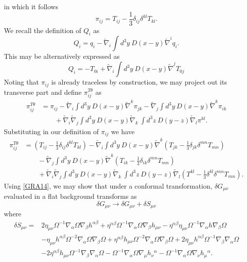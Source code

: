 \documentclass[10pt,letterpaper]{article}
\numberwithin{equation}{subsection}
\begin{document}
in which it follows 
\begin{equation}
\pi_{ij} = T_{ij} -\frac13 \delta_{ij} \delta^{kl}T_{kl}.
\end{equation}
We recall the definition of $Q_i$ as
\begin{equation}
Q_i = q_i - \tilde\nabla_i \int d^3y\ D(x-y)\tilde\nabla^i q_i.
\end{equation}
This may be alternatively expressed as
\begin{equation}
Q_i = -T_{0i} + \tilde\nabla_i \int d^3y\ D(x-y)\tilde\nabla^j T_{0j}
\end{equation}
Noting that $\pi_{ij}$ is already traceless by construction, we may project out its transverse part and define $\pi^{T\theta}_{ij}$ as
\begin{align}
\pi_{ij}^{T\theta} &= \pi_{ij} - \tilde\nabla_i \int d^3y\ D(x-y) \tilde\nabla^k \pi_{jk} - \tilde\nabla_j \int d^3y\ D(x-y) \tilde\nabla^k \pi_{ik}
\nonumber\\
&\qquad
+\tilde\nabla_i\tilde\nabla_j \int d^3y\ D(x-y) \tilde\nabla_k\ \int d^3z\ D(y-z) \tilde\nabla_l \pi^{kl}.
\end{align}
Substituting in our definition of $\pi_{ij}$ we have
\begin{align}
\pi_{ij}^{T\theta} &=\left(T_{ij} -\frac13 \delta_{ij} \delta^{kl}T_{kl}\right) - \tilde\nabla_i \int d^3y\ D(x-y) \tilde\nabla^k \left(T_{jk} -\frac13 \delta_{jk} \delta^{mn}T_{mn}\right)
\nonumber\\
&\qquad
 - \tilde\nabla_j \int d^3y\ D(x-y) \tilde\nabla^k \left(T_{ik} -\frac13 \delta_{ik} \delta^{mn}T_{mn}\right)
\nonumber\\
&\qquad
+\tilde\nabla_i\tilde\nabla_j \int d^3y\ D(x-y) \tilde\nabla_k\ \int d^3z\ D(y-z) \tilde\nabla_l \left(T^{kl} -\frac13 \delta^{kl} \delta^{mn}T_{mn}\right).
\end{align}
Using \eqref{GRA14}, we may show that under a conformal transformation, $\delta G_{\mu\nu}$ evaluated in a flat background transforms as
\begin{equation}
\delta G_{\mu\nu} \to \delta G_{\mu\nu} + \delta S_{\mu\nu}
\end{equation}
where
\begin{align}
\delta S_{\mu\nu}={}&2 \eta_{\mu \nu} \Omega^{-1} \nabla_{\alpha}\Omega \nabla_{\beta}h^{\alpha \beta}
 + \eta^{\alpha \beta} \Omega^{-1} \nabla_{\alpha}\Omega \nabla_{\beta}h_{\mu \nu}
 -  \eta^{\alpha \beta} \eta_{\mu \nu} \Omega^{-1} \nabla_{\alpha}h \nabla_{\beta}\Omega\nonumber\\
& -  \eta_{\mu \nu} h^{\alpha \beta} \Omega^{-2} \nabla_{\alpha}\Omega \nabla_{\beta}\Omega
 + \eta^{\alpha \beta} h_{\mu \nu} \Omega^{-2} \nabla_{\alpha}\Omega \nabla_{\beta}\Omega
 + 2 \eta_{\mu \nu} h^{\alpha \beta} \Omega^{-1} \nabla_{\beta}\nabla_{\alpha}\Omega\nonumber\\
& - 2 \eta^{\alpha \beta} h_{\mu \nu} \Omega^{-1} \nabla_{\beta}\nabla_{\alpha}\Omega
 -  \Omega^{-1} \nabla_{\alpha}\Omega \nabla_{\mu}h_{\nu}{}^{\alpha}
 -  \Omega^{-1} \nabla_{\alpha}\Omega \nabla_{\nu}h_{\mu}{}^{\alpha}.
\end{align}
\end{document}

